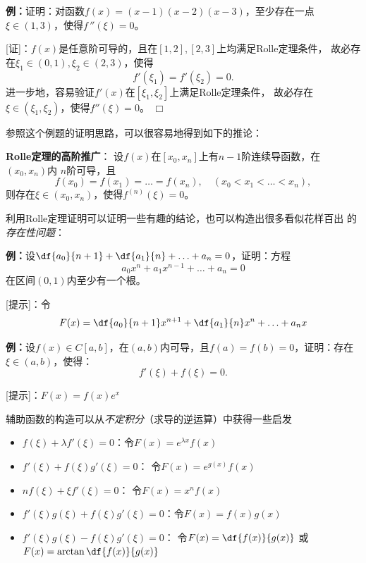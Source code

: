 {\bf 例：}证明：对函数$f(x)=(x-1)(x-2)(x-3)$，至少存在一点
$\xi\in(1,3)$，使得$f\,''(\xi)=0$。

[证]：$f(x)$是任意阶可导的，且在$[1,2],[2,3]$上均满足Rolle定理条件，
故必存在$\xi_1\in(0,1),\xi_2\in(2,3)$，使得
$$f'(\xi_1)=f'(\xi_2)=0.$$
进一步地，容易验证$f'(x)$在$[\xi_1,\xi_2]$上满足Rolle定理条件，
故必存在$\xi\in(\xi_1,\xi_2)$，使得$f''(\xi)=0$。
\hfill$\Box$

参照这个例题的证明思路，可以很容易地得到如下的推论：

\begin{thx}
	{\bf Rolle定理的高阶推广}：
	设$f(x)$在$[x_0,x_n]$上有$n-1$阶连续导函数，在$(x_0,x_n)$内
	$n$阶可导，且
	$$f(x_0)=f(x_1)=\ldots=f(x_n),\quad(x_0<x_1<\ldots<x_n),$$
	则存在$\xi\in(x_0,x_n)$，使得$f^{(n)}(\xi)=0$。
\end{thx}

利用Rolle定理证明可以证明一些有趣的结论，也可以构造出很多看似花样百出
的{\it 存在性问题}：

{\bf 例：}设$\df{a_0}{n+1}+\df{a_1}{n}+\ldots+a_n=0$，证明：方程
$$a_0x^n+a_1x^{n-1}+\ldots+a_n=0$$
在区间$(0,1)$内至少有一个根。

[提示]：令
$$F(x)=\df{a_0}{n+1}x^{n+1}+\df{a_1}{n}x^n+\ldots+a_nx$$

{\bf 例：}设$f(x)\in C[a,b]$，在$(a,b)$内可导，且$f(a)=f(b)=0$，证明：存在
$\xi\in(a,b)$，使得：
$$f'(\xi)+f(\xi)=0.$$

[提示]：$F(x)=f(x)e^x$

\begin{thx}
	辅助函数的构造可以从{\it 不定积分}（求导的逆运算）中获得一些启发
	\begin{itemize}
	  \item $f(\xi)+\lambda f'(\xi)=0$：令$F(x)=e^{\lambda x}f(x)$
	  \item $f'(\xi)+f(\xi)g'(\xi)=0$： 令$F(x)=e^{g(x)}f(x)$
	  \item $nf(\xi)+\xi f'(\xi)=0$： 令$F(x)=x^nf(x)$ 
	  \item $f'(\xi)g(\xi)+f(\xi)g'(\xi)=0$：令$F(x)=f(x)g(x)$
	  \item $f'(\xi)g(\xi)-f(\xi)g'(\xi)=0$： 令$F(x)=\df{f(x)}{g(x)}$
	  或$F(x)=\arctan\df{f(x)}{g(x)}$
	\end{itemize}
\end{thx}

